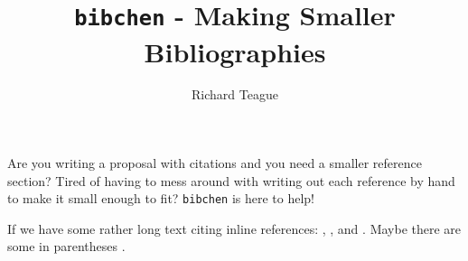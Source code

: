 \documentclass[a4paper, 12pt]{article}
\title{\texttt{bibchen} - Making Smaller Bibliographies}
\author{Richard Teague}
\begin{document}
\maketitle{}

Are you writing a proposal with citations and you need a smaller reference
section? Tired of having to mess around with writing out each reference by hand
to make it small enough to fit? \texttt{bibchen} is here to help!

If we have some rather long text citing inline references:
\citet{Cannon_Pickering_1918}, \citet{Rubin_ea_1980}, and
\citet{Leavitt_1908}. Maybe there are some in parentheses
\citep{Penzias_Wilson_1965, LIGO_2017}.


{}
\end{document}
